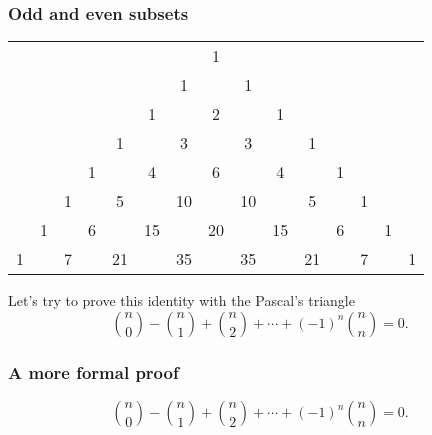\begin{frame}\frametitle{Odd and even subsets}
  \begin{tcolorbox}
    {\footnotesize
      \begin{tabular}{ccccccccccccccc}
        & & & & & & & 1 & & & & & & & \\
        & & & & & & 1 & & 1 & & & & & & \\
        & & & & & 1 & & 2 & & 1 & & & & & \\
        & & & & 1 & & 3 & & 3 & & 1 & & & & \\
        & & & 1 & & 4 & & 6 & & 4 & & 1 & & & \\
        & & 1 & & 5 & & 10 & & 10 & & 5 & & 1 & & \\
        & 1 & & 6 & & 15 & & 20 & & 15 & & 6 & & 1 & \\
        1 & & 7 & & 21 & & 35 & & 35 & & 21 & & 7 & & 1 \\
      \end{tabular}
    }
  \end{tcolorbox}

  Let's try to prove this identity with the Pascal's triangle
  \[
  {n\choose 0} - {n\choose 1} + {n\choose 2} +\cdots +(-1)^{n}{n\choose n} = 0.
  \]
\end{frame}

\begin{frame}\frametitle{A more formal proof}
  \begin{tcolorbox}
    \[
    {n\choose 0} - {n\choose 1} + {n\choose 2} +\cdots +(-1)^{n}{n\choose n} = 0.
    \]
  \end{tcolorbox}
  \vspace{2in}
\end{frame}

